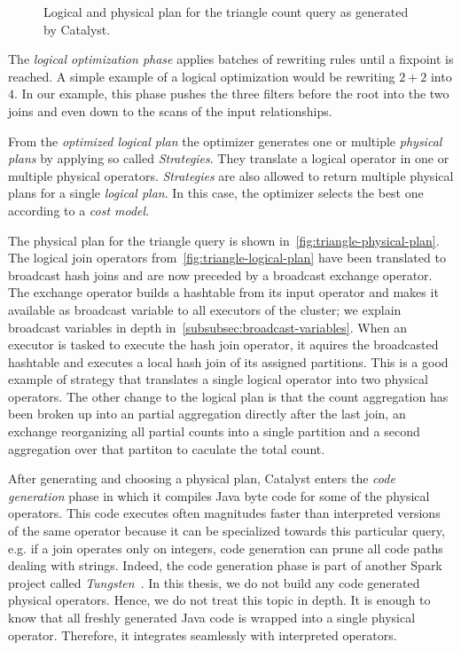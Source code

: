 \begin{figure}
    \centering
    \caption{Logical and physical plan for the triangle count query as generated by Catalyst.}
\end{figure}

The \textit{logical optimization phase} applies batches of rewriting rules until a fixpoint is reached.
A simple example of a logical optimization would be rewriting $2 + 2$ into $4$.
In our example, this phase pushes the three filters before the root into the two joins and even down to the scans of the input
relationships.

From the \textit{optimized logical plan} the optimizer generates one or multiple \textit{physical plans} by
applying so called \textit{Strategies}.
They translate a logical operator in one or multiple physical operators.
\textit{Strategies} are also allowed to return multiple physical plans for a single \textit{logical plan}.
In this case, the optimizer selects the best one according to a \textit{cost model}.

The physical plan for the triangle query is shown in~\cref{fig:triangle-physical-plan}.
The logical join operators from~\cref{fig:triangle-logical-plan} have been translated to broadcast hash joins and are now preceded by a
broadcast exchange operator.
The exchange operator builds a hashtable from its input operator and makes it available as broadcast variable to all executors of
the cluster; we explain broadcast variables in depth in~\cref{subsubsec:broadcast-variables}.
When an executor is tasked to execute the hash join operator, it aquires the broadcasted hashtable and executes a local hash join
of its assigned partitions.
This is a good example of strategy that translates a single logical operator into two physical operators.
The other change to the logical plan is that the count aggregation has been broken up into an partial aggregation directly after the
last join, an exchange reorganizing all partial counts into a single partition and a second aggregation over that partiton to caculate
the total count.

After generating and choosing a physical plan, Catalyst enters the \textit{code generation} phase in which it compiles Java byte code for
some of the physical operators.
This code executes often magnitudes faster than interpreted versions~\cite{spark-sql} of the same operator because
it can be specialized towards this particular query, e.g. if a join operates only on integers, code
generation can prune all code paths dealing with strings.
Indeed, the code generation phase is part of another Spark project called
\textit{Tungsten}~\cite{tungsten-project,tungsten-code-generation}.
In this thesis, we do not build any code generated physical operators.
Hence, we do not treat this topic in depth.
It is enough to know that all freshly generated Java code is wrapped into a single physical operator.
Therefore, it integrates seamlessly with interpreted operators.

